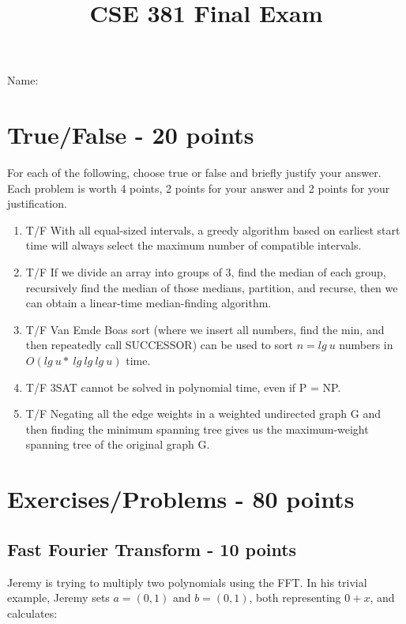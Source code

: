 \documentclass[12pt]{amsart}
\title{CSE 381 Final Exam}
\begin{document}
\maketitle


Name: 
\\

\section{True/False - 20 points}
\begin{bf}For each of the following, choose true or false and briefly justify your answer. Each problem is worth 4 points, 2 points for your answer and 2 points for your justification. \end{bf}
\begin{enumerate} 
\item T/F With all equal-sized intervals, a greedy algorithm based on earliest
start time will always select the maximum number of compatible intervals. \\
\item T/F If we divide an array into groups of 3, find the median of each group,
recursively find the median of those medians, partition, and recurse, then we can
obtain a linear-time median-finding algorithm. \\
\item T/F Van Emde Boas sort (where we insert all numbers, find the min, and
then repeatedly call SUCCESSOR) can be used to sort $n = lg \: u$ numbers in $O(lg \: u * \:
lg\: lg\: lg\: u)$ time. \\
\item T/F 3SAT cannot be solved in polynomial time, even if P = NP. \\
\item T/F Negating all the edge weights in a weighted undirected graph G and
then finding the minimum spanning tree gives us the maximum-weight spanning
tree of the original graph G. 
\end{enumerate}

\section{Exercises/Problems - 80 points}

\subsection{Fast Fourier Transform - 10 points} 
Jeremy is trying to multiply two polynomials using the FFT. In his trivial example, Jeremy sets
$a = (0, 1)$ and $b = (0, 1)$, both representing $0 + x$, and calculates:  
\\
\end{document}
